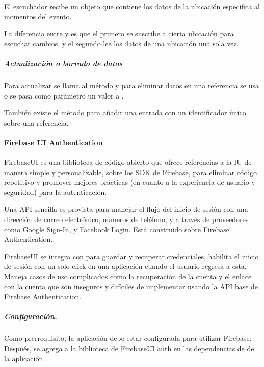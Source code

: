 El escuchador recibe un objeto  que contiene los datos de la
ubicación especifica al momentos del evento.

La diferencia entre  y
 es que el primero se suscribe a cierta
ubicación para escuchar cambios, y el segundo lee los datos de una ubicación
una sola vez.


\subparagraph{Actualización o borrado de datos}
\label{\detokenize{dev_docs:actulizacion-o-borrado-de-datos}}
Para actualizar se llama al método  y para eliminar datos
en una referencia se usa  o se pasa como parámetro un valor
 a .

También existe el método  para añadir una entrada con un identificador
único sobre una referencia.


\paragraph{Firebase UI Authentication}
\label{\detokenize{dev_docs:firebase-ui-authentication}}
FirebaseUI es una biblioteca de código abierto que ofrece referencias a la IU
de manera simple y personalizable, sobre los SDK de Firebase, para eliminar
código repetitivo y promover mejores prácticas (en cuanto a la experiencia
de usuario y seguridad) para la autenticación.

Una API sencilla es provista para manejar el flujo del inicio de sesión con una
dirección de correo electrónico, números de teléfono, y a través de
proveedores como Google Sign-In, y Facebook Login. Está construido sobre
Firebase Authentication.

FirebaseUI se integra con  para guardar y recuperar credenciales,
habilita el inicio de sesión con un solo click en una aplicación cuando el
usuario regresa a esta. Maneja casos de uso complicados como la recuperación
de la cuenta y el enlace con la cuenta que son inseguros y difíciles de implementar
usando la API base de Firebase Authentication.


\subparagraph{Configuración.}
\label{\detokenize{dev_docs:configuracion}}
Como prerrequisito, la aplicación debe estar configurada para utilizar Firebase.
Después, se agrega a la biblioteca de FirebaseUI auth en las dependencias de
 de la aplicación.


